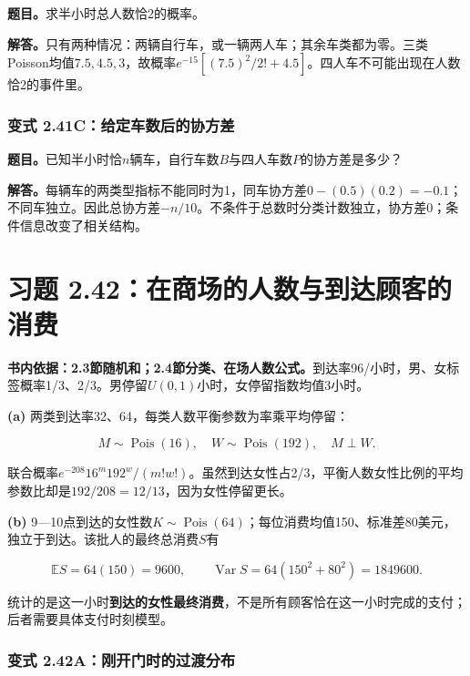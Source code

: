 \documentclass[12pt,a4paper,UTF8,fontset=fandol]{ctexart}
\begin{document}
\textbf{题目。}求半小时总人数恰2的概率。

\textbf{解答。}只有两种情况：两辆自行车，或一辆两人车；其余车类都为零。三类Poisson均值\(7.5,4.5,3\)，故概率\(e^{-15}[(7.5)^2/2!+4.5]\)。四人车不可能出现在人数恰2的事件里。

\subsubsection{变式
2.41C：给定车数后的协方差}\label{ux53d8ux5f0f-2.41cux7ed9ux5b9aux8f66ux6570ux540eux7684ux534fux65b9ux5dee}

\textbf{题目。}已知半小时恰\(n\)辆车，自行车数\(B\)与四人车数\(P\)的协方差是多少？

\textbf{解答。}每辆车的两类型指标不能同时为1，同车协方差\(0-(0.5)(0.2)=-0.1\)；不同车独立。因此总协方差\(-n/10\)。不条件于总数时分类计数独立，协方差0；条件信息改变了相关结构。

\section{习题
2.42：在商场的人数与到达顾客的消费}\label{ux4e60ux9898-2.42ux5728ux5546ux573aux7684ux4ebaux6570ux4e0eux5230ux8fbeux987eux5ba2ux7684ux6d88ux8d39}

\textbf{书内依据：2.3節随机和；2.4節分类、在场人数公式。}到达率96/小时，男、女标签概率1/3、2/3。男停留\(U(0,1)\)小时，女停留指数均值3小时。

\textbf{(a)} 两类到达率32、64，每类人数平衡参数为率乘平均停留：

\[\boxed{M\sim\operatorname{Pois}(16),\quad W\sim\operatorname{Pois}(192),\quad M\perp W.}\]

联合概率\(e^{-208}16^m192^w/(m!w!)\)。虽然到达女性占2/3，平衡人数女性比例的平均参数比却是\(192/208=12/13\)，因为女性停留更长。

\textbf{(b)}
9---10点到达的女性数\(K\sim\operatorname{Pois}(64)\)；每位消费均值150、标准差80美元，独立于到达。该批人的最终总消费\(S\)有

\[\boxed{\mathbb ES=64(150)=9600,\qquad
\operatorname{Var}S=64(150^2+80^2)=1849600.}\]

统计的是这一小时\textbf{到达的女性最终消费}，不是所有顾客恰在这一小时完成的支付；后者需要具体支付时刻模型。

\subsubsection{变式
2.42A：刚开门时的过渡分布}\label{ux53d8ux5f0f-2.42aux521aux5f00ux95e8ux65f6ux7684ux8fc7ux6e21ux5206ux5e03}
\end{document}

